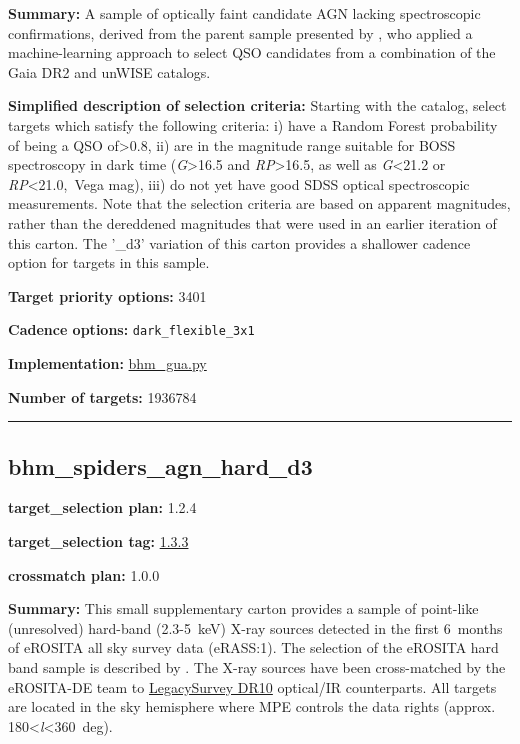 \noindent\textbf{Summary:} A sample of optically faint candidate AGN lacking
spectroscopic confirmations, derived from the parent sample presented by
\citet{Shu2019}, who applied a machine-learning approach to select QSO
candidates from a combination of the Gaia DR2 and unWISE catalogs.

\noindent\textbf{Simplified description of selection criteria:} Starting with the
\citet{Shu2019} catalog, select targets which satisfy the following
criteria: i) have a Random Forest probability of being a QSO
of\textgreater0.8, ii) are in the magnitude range suitable for BOSS
spectroscopy in dark time (\emph{G}\textgreater16.5 and
\emph{RP}\textgreater16.5, as well as \emph{G}\textless21.2 or
\emph{RP}\textless21.0,~Vega mag), iii) do not yet have good SDSS
optical spectroscopic measurements. Note that the selection criteria are
based on apparent magnitudes, rather than the dereddened magnitudes that
were used in an earlier iteration of this carton. The '\_d3' variation
of this carton provides a shallower cadence option for targets in this
sample.


\noindent\textbf{Target priority options:} 3401

\noindent\textbf{Cadence options:} \texttt{dark\_flexible\_3x1}

\noindent\textbf{Implementation:}
\href{https://github.com/sdss/target_selection/blob/1.3.3/python/target_selection/cartons/bhm_gua.py}{bhm\_gua.py}

\noindent\textbf{Number of targets:} 1936784

\begin{center}\rule{0.5\linewidth}{0.5pt}\end{center}

\hypertarget{bhm_spiders_agn_hard_d3_plan1.2.4}{%
\subsection{bhm\_spiders\_agn\_hard\_d3}\label{bhm_spiders_agn_hard_d3_plan1.2.4}}

\noindent\textbf{target\_selection plan:} 1.2.4

\noindent\textbf{target\_selection tag:}
\href{https://github.com/sdss/target_selection/tree/1.3.3/}{1.3.3}

\noindent\textbf{crossmatch plan:} 1.0.0

\noindent\textbf{Summary:} This small supplementary carton provides a sample of
point-like (unresolved) hard-band (2.3-5~keV) X-ray sources detected in
the first 6~months of eROSITA all sky survey data (eRASS:1). The
selection of the eROSITA hard band sample is described by
\citealt{Waddell2026}. The X-ray sources have been cross-matched by the
eROSITA-DE team to
\href{https://www.legacysurvey.org/dr10/}{LegacySurvey DR10} optical/IR
counterparts. All targets are located in the sky hemisphere where MPE
controls the data rights (approx.
180\textless{}\emph{l}\textless360~deg).


